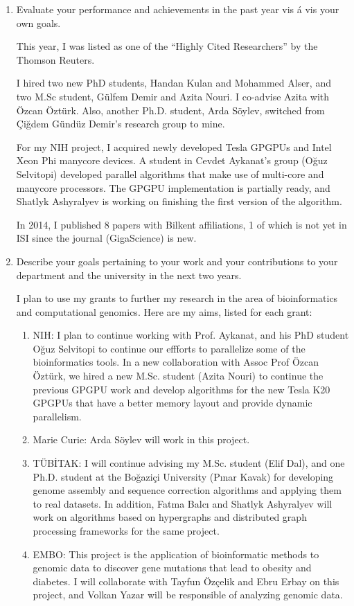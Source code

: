 \begin{enumerate}

\item Evaluate your performance and achievements in the past year vis á vis your own goals. 

This year, I was listed as one of the ``Highly Cited Researchers'' by the Thomson Reuters.

I hired two new PhD students, Handan Kulan and Mohammed Alser, and two M.Sc student, Gülfem Demir and Azita Nouri. I co-advise Azita with Özcan Öztürk.
 Also, another Ph.D. student, Arda Söylev, switched from Çiğdem Gündüz Demir's research group to mine.

For my NIH project, I acquired newly developed Tesla GPGPUs and Intel Xeon Phi manycore devices. A student in Cevdet Aykanat's group (Oğuz Selvitopi) developed parallel algorithms that make use of multi-core and manycore processors. The GPGPU implementation is partially ready, and Shatlyk Ashyralyev is working on finishing the first version of the algorithm.

In 2014, I published 8 papers with Bilkent affiliations, 1 of which is not yet in ISI since the journal (GigaScience) is new. 

\item Describe your goals pertaining to your work and your contributions to your department and the university in the next two years. 

I plan to use my grants to further my research in the area of bioinformatics and computational genomics. Here are my aims, listed for each grant:

\begin{enumerate}

\item NIH: I plan to continue working with Prof. Aykanat, and his PhD student Oğuz Selvitopi to continue our effforts to parallelize some of the bioinformatics tools. In a new collaboration with Assoc Prof Özcan Öztürk, we hired a new M.Sc. student (Azita Nouri) to continue the previous GPGPU work and develop algorithms for the new Tesla K20 GPGPUs that have a better memory layout and provide dynamic parallelism.
\item Marie Curie: Arda Söylev will work in this project.
\item TÜBİTAK: I will continue advising my  M.Sc. student (Elif Dal), and one Ph.D. student at the Boğaziçi University (Pınar Kavak) for developing genome assembly and sequence correction algorithms and applying them to real datasets. In addition, Fatma Balcı and Shatlyk Ashyralyev will work on algorithms based on hypergraphs and distributed graph processing frameworks for the same project.
\item EMBO: This project is the application of bioinformatic methods to genomic data to discover gene 	  mutations that lead to obesity and diabetes. I will collaborate with Tayfun Özçelik and Ebru Erbay on   	  this project, and Volkan Yazar will be responsible of analyzing genomic data.

\end{enumerate}

\end{enumerate}

